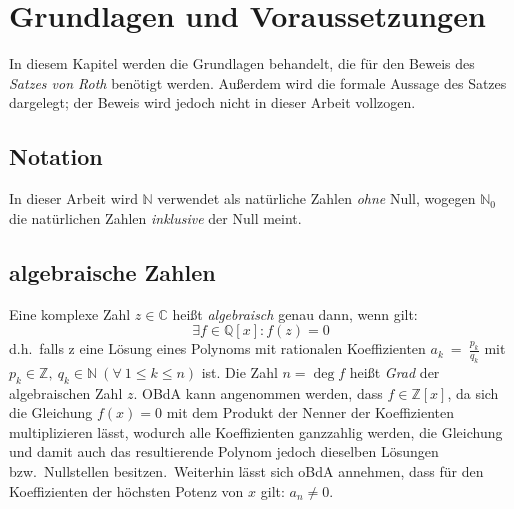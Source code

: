 
\section{Grundlagen und Voraussetzungen}
    \label{sec:preliminaries}
    \textrm{In diesem Kapitel werden die Grundlagen behandelt, die für den Beweis des \emph{Satzes von Roth} benötigt
    werden. Außerdem wird die formale Aussage des Satzes dargelegt; der Beweis wird jedoch nicht in dieser Arbeit vollzogen.}
    
    \subsection{Notation}
    \label{subsec:notation}
        \textrm{In dieser Arbeit wird $\mathbb{N}$ verwendet als natürliche Zahlen \emph{ohne} Null, wogegen $\mathbb{N}_0$
        die natürlichen Zahlen \emph{inklusive} der Null meint.}
    
    \subsection{algebraische Zahlen}
        \label{subsec:algebraic-numbers}
        \textrm{Eine komplexe Zahl $z \in \mathbb{C}$ heißt \emph{algebraisch} genau dann, wenn gilt:}
        \begin{equation}
            \exists f \in \mathbb{Q}[x] : f(z) = 0 \label{eq:def-algebraic}
        \end{equation}
        \textrm{d.h.\ falls z eine Lösung eines Polynoms mit rationalen Koeffizienten $a_k~=~\frac{p_k}{q_k}$ mit $p_k \in
        \mathbb{Z},\ q_k \in \mathbb{N}\ (\forall \ 1 \leq k \leq n)$ ist.
        \newline
        Die Zahl $n = \deg f$ heißt \emph{Grad} der algebraischen Zahl $z$.
        \newline
        OBdA kann angenommen werden, dass $f \in \mathbb{Z}[x]$, da sich die
        Gleichung $f(x) = 0$ mit dem Produkt der Nenner der Koeffizienten multiplizieren lässt, wodurch alle Koeffizienten ganzzahlig werden,
        die Gleichung und damit auch das resultierende Polynom jedoch dieselben Lösungen bzw.\ Nullstellen besitzen.\
        Weiterhin lässt sich oBdA annehmen, dass für den Koeffizienten der höchsten Potenz von $x$ gilt: $a_n \neq 0$.}
    

